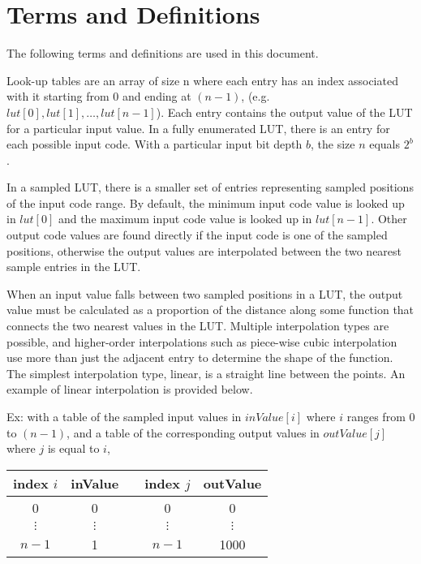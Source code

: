 \numberedformat
\chapter{Terms and Definitions}
The following terms and definitions are used in this document.
\label{sec:termsanddefs}

Look-up tables are an array of size n where each entry has an index associated with it starting from $0$ and ending at $(n-1)$, (e.g. $lut[0], lut[1], \ldots , lut[n-1]$). Each entry contains the output value of the LUT for a particular input value. In a fully enumerated LUT, there is an entry for each possible input code. With a particular input bit depth $b$, the size $n$ equals $2^b$.

In a sampled LUT, there is a smaller set of entries representing sampled positions of the input code range.  By default, the minimum input code value is looked up in $lut[0]$ and the maximum input code value is looked up in $lut[n-1]$.  Other output code values are found directly if the input code is one of the sampled positions, otherwise the output values are interpolated between the two nearest sample entries in the LUT.

When an input value falls between two sampled positions in a LUT, the output value must be calculated as a proportion of the distance along some function that connects the two nearest values in the LUT. Multiple interpolation types are possible, and higher-order interpolations such as piece-wise cubic interpolation use more than just the adjacent entry to determine the shape of the function. The simplest interpolation type, linear, is a straight line between the points. An example of linear interpolation is provided below.

Ex: with a table of the sampled input values in $inValue[i]$ where $i$ ranges from $0$ to $(n-1)$, and a table of the corresponding output values in $outValue[j]$ where $j$ is equal to $i$,

\begin{center}
\begin{tabularx}{3in}{ccXcc}
	index $i$ & inValue && index $j$ & outValue \\ \hline
	0 & 0 && 0 & 0 \\
	$\vdots$ & $\vdots$ && $\vdots$ & $\vdots$ \\
	$n-1$ & 1 && $n-1$ & 1000 \\
\end{tabularx}
\end{center}

